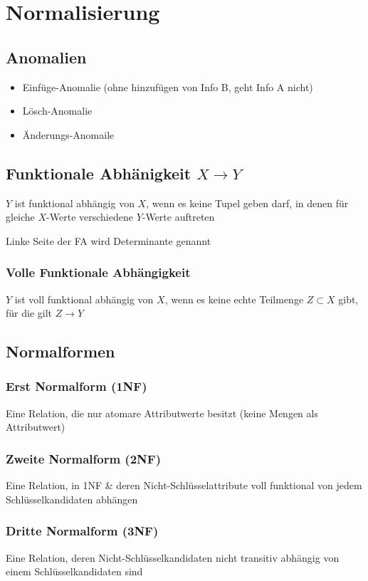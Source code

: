 \section{Normalisierung}
\subsection{Anomalien}
\begin{itemize}
	\item Einfüge-Anomalie (ohne hinzufügen von Info B, geht Info A nicht)
	\item Lösch-Anomalie
	\item Änderungs-Anomaile
\end{itemize}
\subsection{Funktionale Abhänigkeit $X\to Y$}
$Y$ ist funktional abhängig von $X$, wenn es keine Tupel geben darf, in denen für gleiche $X$-Werte verschiedene $Y$-Werte auftreten

Linke Seite der FA wird \glqq{}Determinante\grqq{} genannt
\subsubsection{Volle Funktionale Abhängigkeit}
$Y$ ist voll funktional abhängig von $X$, wenn es keine echte Teilmenge $Z\subset X$ gibt, für die gilt $Z\to Y$

\subsection{Normalformen}
\subsubsection{Erst Normalform (1NF)}
Eine Relation, die nur atomare Attributwerte besitzt (keine Mengen als Attributwert)
\subsubsection{Zweite Normalform (2NF)}
Eine Relation, in 1NF \& deren Nicht-Schlüsselattribute voll funktional von jedem Schlüsselkandidaten abhängen
\subsubsection{Dritte Normalform (3NF)}
Eine Relation, deren Nicht-Schlüsselkandidaten nicht transitiv abhängig von einem Schlüsselkandidaten sind
